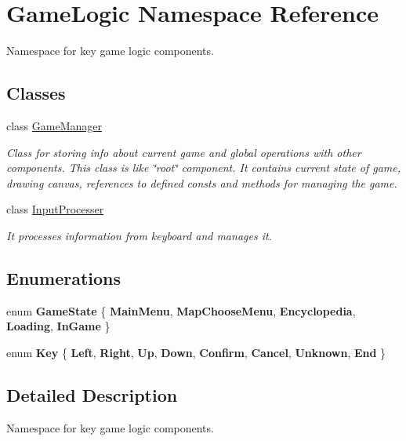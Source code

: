 \hypertarget{namespaceGameLogic}{}\section{Game\+Logic Namespace Reference}
\label{namespaceGameLogic}


Namespace for key game logic components.  


\subsection*{Classes}
\begin{DoxyCompactItemize}
\item 
class \hyperlink{classGameLogic_1_1GameManager}{Game\+Manager}
\begin{DoxyCompactList}\small\item\em Class for storing info about current game and global operations with other components. This class is like \char`\"{}root\char`\"{} component. It contains current state of game, drawing canvas, references to defined consts and methods for managing the game. \end{DoxyCompactList}\item 
class \hyperlink{classGameLogic_1_1InputProcesser}{Input\+Processer}
\begin{DoxyCompactList}\small\item\em It processes information from keyboard and manages it. \end{DoxyCompactList}\end{DoxyCompactItemize}
\subsection*{Enumerations}
\begin{DoxyCompactItemize}
\item 
\mbox{\label{namespaceGameLogic_abb5b7822371961e99133b7cf0ae192b0}} 
enum {\bfseries Game\+State} \{ \newline
{\bfseries Main\+Menu}, 
{\bfseries Map\+Choose\+Menu}, 
{\bfseries Encyclopedia}, 
{\bfseries Loading}, 
\newline
{\bfseries In\+Game}
 \}
\item 
\mbox{\label{namespaceGameLogic_acb087bb540f1eed292f109e0be6f3aeb}} 
enum {\bfseries Key} \{ \newline
{\bfseries Left}, 
{\bfseries Right}, 
{\bfseries Up}, 
{\bfseries Down}, 
\newline
{\bfseries Confirm}, 
{\bfseries Cancel}, 
{\bfseries Unknown}, 
{\bfseries End}
 \}
\end{DoxyCompactItemize}


\subsection{Detailed Description}
Namespace for key game logic components. 
